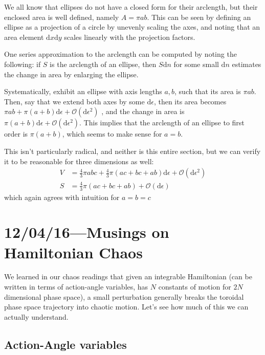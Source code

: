 \documentclass[10pt]{article}
\begin{document}
We all know that ellipses do not have a closed form for their arclength, but
their enclosed area is well defined, namely $A = \pi ab$. This can be seen by
defining an ellipse as a projection of a circle by unevenly scaling the axes,
and noting that an area element $\mathrm{d}x\mathrm{d}y$ scales linearly with
the projection factors.

One series approximation to the arclength can be computed by noting the
following: if $S$ is the arclength of an ellipse, then $S\mathrm{d}n$ for some
small $\mathrm{d}n$ estimates the change in area by enlarging the ellipse.

Systematically, exhibit an ellipse with axis lengths $a,b$, such that its area
is $\pi ab$. Then, say that we extend both axes by some $\mathrm{d}\epsilon$,
then its area becomes
$\pi ab + \pi (a+b)\mathrm{d} \epsilon + \mathcal{O}(\mathrm{d}\epsilon^2)$
, and the change in area is
$\pi (a+b) \mathrm{d}\epsilon + \mathcal{O}(\mathrm{d}\epsilon^2)$.
This implies that the arclength of an ellipse to first order is $\pi(a+b)$,
which seems to make sense for $a=b$.

This isn't particularly radical, and neither is this entire section, but we can
verify it to be reasonable for three dimensions as well:
\begin{align}
    V &= \frac{4}{3}\pi abc + \frac{4}{3}\pi(ac + bc + ab)\mathrm{d}\epsilon
        + \mathcal{O}(\mathrm{d}\epsilon^2)\\
    S &= \frac{4}{3}\pi\left( ac + bc + ab \right)
        + \mathcal{O}(\mathrm{d}\epsilon)
\end{align}
which again agrees with intuition for $a=b=c$

\clearpage
\section{12/04/16---Musings on Hamiltonian Chaos}

We learned in our chaos readings that given an integrable Hamiltonian (can be
written in terms of action-angle variables, has $N$ constants of motion for $2N$
dimensional phase space), a small perturbation generally breaks the toroidal
phase space trajectory into chaotic motion. Let's see how much of this we can
actually understand.

\subsection{Action-Angle variables}
\end{document}
